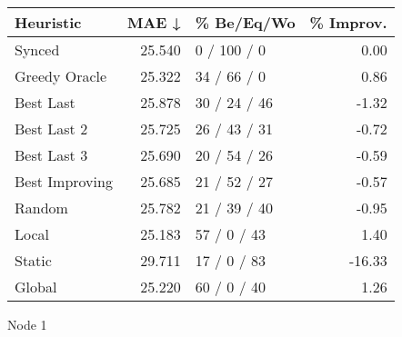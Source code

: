 \begin{tabular}{lrlr}
\toprule
\textbf{Heuristic} & \textbf{MAE ↓} & \textbf{\% Be/Eq/Wo} & \textbf{\% Improv.} \\
\midrule
            Synced &         25.540 &          0 / 100 / 0 &                0.00 \\
     Greedy Oracle &         25.322 &          34 / 66 / 0 &                0.86 \\
         Best Last &         25.878 &         30 / 24 / 46 &               -1.32 \\
       Best Last 2 &         25.725 &         26 / 43 / 31 &               -0.72 \\
       Best Last 3 &         25.690 &         20 / 54 / 26 &               -0.59 \\
    Best Improving &         25.685 &         21 / 52 / 27 &               -0.57 \\
            Random &         25.782 &         21 / 39 / 40 &               -0.95 \\
             Local &         25.183 &          57 / 0 / 43 &                1.40 \\
            Static &         29.711 &          17 / 0 / 83 &              -16.33 \\
            Global &         25.220 &          60 / 0 / 40 &                1.26 \\
\bottomrule
\end{tabular}
\caption{Node 1}
\label{tab:iid_lr05_le1_bs4_1}
